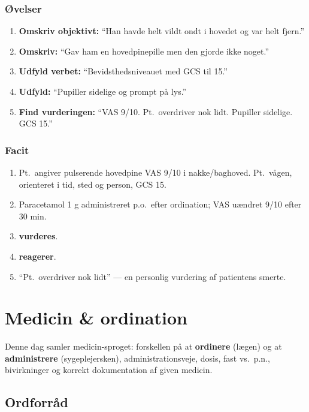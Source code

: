 \documentclass[11pt,a4paper]{report}
\begin{document}
\subsection{Øvelser}
\begin{enumerate}[leftmargin=1.5em,itemsep=8pt]
\item \textbf{Omskriv objektivt:} ``Han havde helt vildt ondt i hovedet og var helt fjern.''
\item \textbf{Omskriv:} ``Gav ham en hovedpinepille men den gjorde ikke noget.''
\item \textbf{Udfyld verbet:} ``Bevidsthedsniveauet \underline{\hspace{2.5cm}} med GCS til 15.''
\item \textbf{Udfyld:} ``Pupiller sidelige og \underline{\hspace{2.5cm}} prompt på lys.''
\item \textbf{Find vurderingen:} ``VAS 9/10. Pt.\ overdriver nok lidt. Pupiller sidelige. GCS 15.''
\end{enumerate}

\subsection{Facit}
\begin{enumerate}[leftmargin=1.5em,itemsep=5pt]
\item Pt.\ angiver pulserende hovedpine VAS 9/10 i nakke/baghoved. Pt.\ vågen, orienteret i tid, sted og person, GCS 15.
\item Paracetamol 1 g administreret p.o.\ efter ordination; VAS uændret 9/10 efter 30 min.
\item \textbf{vurderes}.
\item \textbf{reagerer}.
\item ``Pt.\ overdriver nok lidt'' --- en personlig vurdering af patientens smerte.
\end{enumerate}

\chapter{Medicin \& ordination}

Denne dag samler medicin-sproget: forskellen på at \textbf{ordinere} (lægen) og at
\textbf{administrere} (sygeplejersken), administrationsveje, dosis, fast vs.\ p.n.,
bivirkninger og korrekt dokumentation af given medicin.

\section{Ordforråd}
\end{document}
